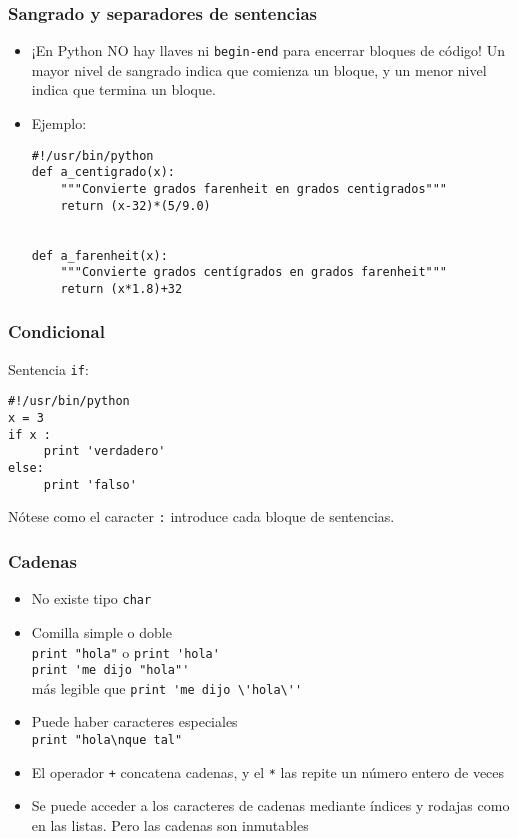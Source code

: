 \begin{frame}[fragile]
\frametitle{Sangrado y separadores de sentencias}

\begin{itemize}
\item ¡En Python NO hay llaves ni \verb|begin-end| para encerrar bloques
  de código! Un mayor nivel de sangrado indica que comienza un bloque,
  y un menor nivel indica que termina un bloque.
  
\item Ejemplo:

  \begin{footnotesize}
\begin{verbatim}
#!/usr/bin/python
def a_centigrado(x):
    """Convierte grados farenheit en grados centigrados"""
    return (x-32)*(5/9.0)


def a_farenheit(x):
    """Convierte grados centígrados en grados farenheit"""
    return (x*1.8)+32
\end{verbatim}
  \end{footnotesize}
\end{itemize}
\end{frame}




\begin{frame}[fragile]
\frametitle{Condicional}

Sentencia \verb|if|:

\begin{footnotesize}
\begin{verbatim}
#!/usr/bin/python
x = 3
if x :
     print 'verdadero'
else:
     print 'falso'
\end{verbatim}
\end{footnotesize}
Nótese como el caracter \verb|:| introduce cada bloque de sentencias.
\end{frame}



\begin{frame}[fragile]
\frametitle{Cadenas}

\begin{itemize}
\item No existe tipo \verb|char|
\item 
Comilla simple o doble \\
\verb|print "hola"|  o \verb|print 'hola'|  \\
\verb|print 'me dijo "hola"'| \\
más legible que \verb|print 'me dijo \'hola\''|
\item 
Puede haber caracteres especiales\\
\verb|print "hola\nque tal"|   

\item El operador \verb|+| concatena cadenas, y el \verb|*| las repite
  un número entero de veces
\item Se puede acceder a los caracteres de cadenas mediante índices y
  rodajas como en las listas. Pero las cadenas son inmutables
\end{itemize}
\end{frame}





